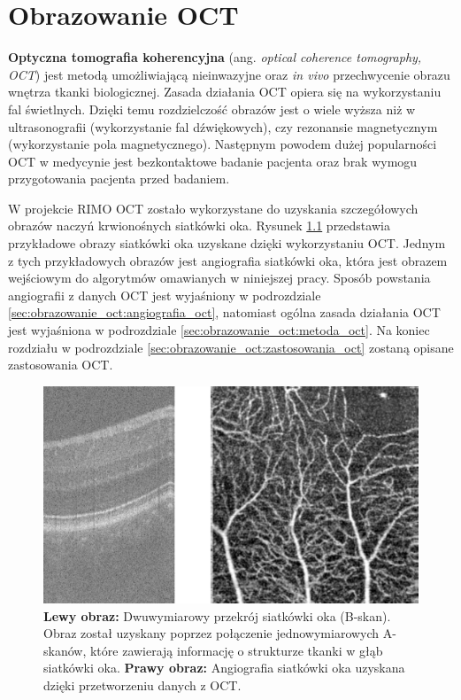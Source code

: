 %
\chapter{Obrazowanie OCT}
\label{sec:obrazowanie_oct}


\textbf{Optyczna tomografia koherencyjna} (ang. \textit{optical coherence tomography, OCT}) jest metodą umożliwiającą nieinwazyjne oraz \textit{in vivo} przechwycenie obrazu wnętrza tkanki biologicznej. Zasada działania OCT opiera się na wykorzystaniu fal świetlnych. Dzięki temu rozdzielczość obrazów jest o wiele wyższa niż w ultrasonografii (wykorzystanie fal dźwiękowych), czy rezonansie magnetycznym (wykorzystanie pola magnetycznego). Następnym powodem dużej popularności OCT w medycynie jest bezkontaktowe badanie pacjenta oraz brak wymogu przygotowania pacjenta przed badaniem.

W projekcie RIMO OCT zostało wykorzystane do uzyskania szczegółowych obrazów naczyń krwionośnych siatkówki oka. Rysunek \ref{fig:obrazowanie_oct:bscan_vessels} przedstawia przykładowe obrazy siatkówki oka uzyskane dzięki wykorzystaniu OCT. Jednym z tych przykładowych obrazów jest angiografia siatkówki oka, która jest obrazem wejściowym do algorytmów omawianych w niniejszej pracy. Sposób powstania angiografii z danych OCT jest wyjaśniony w podrozdziale \ref{sec:obrazowanie_oct:angiografia_oct}, natomiast ogólna zasada działania OCT jest wyjaśniona w podrozdziale \ref{sec:obrazowanie_oct:metoda_oct}. Na koniec rozdziału w podrozdziale \ref{sec:obrazowanie_oct:zastosowania_oct} zostaną opisane zastosowania OCT.

\begin{figure}[htb]
	\centering
	\includegraphics[width=\textwidth]{gfx/bscan_vessels}
	\caption{\textbf{Lewy obraz:} Dwuwymiarowy przekrój siatkówki oka (B-skan). Obraz został uzyskany poprzez połączenie jednowymiarowych A-skanów, które zawierają informację o strukturze tkanki w głąb siatkówki oka. \textbf{Prawy obraz:} Angiografia siatkówki oka uzyskana dzięki przetworzeniu danych z OCT.}
	\label{fig:obrazowanie_oct:bscan_vessels}
\end{figure}

